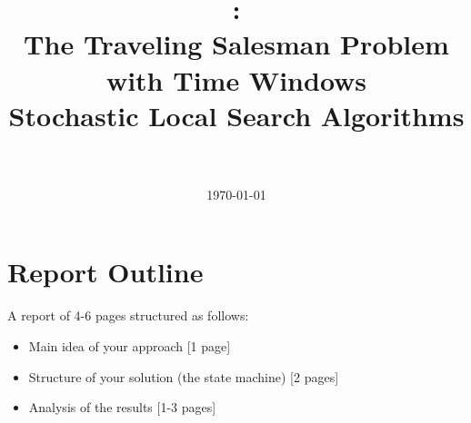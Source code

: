\documentclass{article}
\title{
\vspace{2in}
\textmd{\textbf{\hmwkClass:\\ The Traveling Salesman Problem with Time Windows \\ Stochastic Local Search Algorithms}}\\
\vspace{0.1in}\large{\textit{\hmwkClassInstructor\ }}
\vspace{3in}
}
\author{\textbf{\hmwkAuthorName}}
\date{\today} %
\newcommand{\maxmin}{$\mathcal{MAX}-\mathcal{MIN}$}
\begin{document}




\newpage
\tableofcontents
\newpage

\section{Report Outline}
A report of 4-6 pages structured as follows:
\begin{itemize}
\item Main idea of your approach [1 page]
\item Structure of your solution (the state machine) [2 pages]
\item Analysis of the results [1-3 pages]
\end{itemize}






\end{document}
